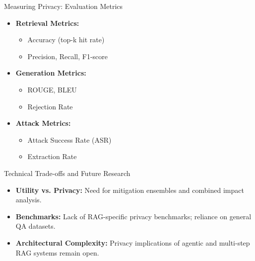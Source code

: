 \documentclass[aspectratio=169,xcolor=dvipsnames]{beamer}
\begin{document}
	\begin{frame}{Measuring Privacy: Evaluation Metrics}
		
		\begin{itemize}
			\item \textbf{Retrieval Metrics:}
			\begin{itemize}
				\item Accuracy (top-k hit rate)
				\item Precision, Recall, F1-score
			\end{itemize}
			
			\item \textbf{Generation Metrics:}
			\begin{itemize}
				\item ROUGE, BLEU
				\item Rejection Rate
			\end{itemize}
			
			\item \textbf{Attack Metrics:}
			\begin{itemize}
				\item Attack Success Rate (ASR)
				\item Extraction Rate
			\end{itemize}
		\end{itemize}
		
	\end{frame}
	
	\begin{frame}{Technical Trade-offs and Future Research}
		
		\begin{itemize}
			\item \textbf{Utility vs. Privacy:} Need for mitigation ensembles and combined impact analysis.
			
			\item \textbf{Benchmarks:} Lack of RAG-specific privacy benchmarks; reliance on general QA datasets.
			
			\item \textbf{Architectural Complexity:} Privacy implications of agentic and multi-step RAG systems remain open.
		\end{itemize}
		
	\end{frame}
	
\end{document}
